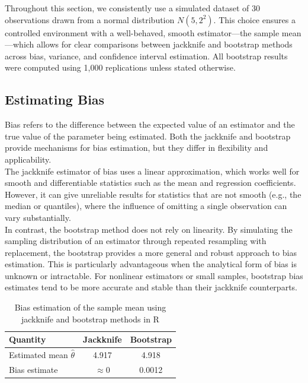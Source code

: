 \documentclass{article}
\begin{document}
Throughout this section, we consistently use a simulated dataset of 30 observations drawn from a normal distribution \( N(5, 2^2) \). This choice ensures a controlled environment with a well-behaved, smooth estimator—the sample mean—which allows for clear comparisons between jackknife and bootstrap methods across bias, variance, and confidence interval estimation. All bootstrap results were computed using 1,000 replications unless stated otherwise.


\subsection{Estimating Bias}

Bias refers to the difference between the expected value of an estimator and the true value of the parameter being estimated. Both the jackknife and bootstrap provide mechanisms for bias estimation, but they differ in flexibility and applicability. \\

The jackknife estimator of bias uses a linear approximation, which works well for smooth and differentiable statistics such as the mean and regression coefficients. However, it can give unreliable results for statistics that are not smooth (e.g., the median or quantiles), where the influence of omitting a single observation can vary substantially. \\

In contrast, the bootstrap method does not rely on linearity. By simulating the sampling distribution of an estimator through repeated resampling with replacement, the bootstrap provides a more general and robust approach to bias estimation. This is particularly advantageous when the analytical form of bias is unknown or intractable. For nonlinear estimators or small samples, bootstrap bias estimates tend to be more accurate and stable than their jackknife counterparts. \\

\begin{table}[h!]
\centering
\caption{Bias estimation of the sample mean using jackknife and bootstrap methods in R}
\begin{tabular}{|l|c|c|}
\hline
\textbf{Quantity} & \textbf{Jackknife} & \textbf{Bootstrap} \\
\hline
Estimated mean $\hat{\theta}$ & 4.917 & 4.918 \\
Bias estimate                 & $\approx 0$ & 0.0012 \\
\hline
\end{tabular}
\label{tab:bias-comparison}
\end{table}
\end{document}
